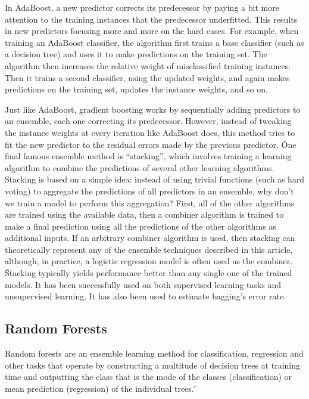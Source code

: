 In AdaBoost, a new predictor corrects its predecessor by paying a bit more attention to the training instances that
the predecessor underfitted. This results in new predictors focusing more and more on the hard cases. For example,
when training an AdaBoost classifier, the algorithm first trains a base classifier (such as a decision tree) and uses
it to make predictions on the training set. The algorithm then increases the relative weight of misclassified
training instances. Then it trains a second classifier, using the updated weights, and again makes predictions on the
training set, updates the instance weights, and so on.

\vspace{7pt}


\v

Just like AdaBoost, gradient boosting works by sequentially adding predictors to an ensemble, each one correcting its
predecessor. However, instead of tweaking the instance weights at every iteration like AdaBoost does, this method
tries to fit the new predictor to the residual errors made by the previous predictor. \v

One final famous ensemble method is ``stacking'', which involves training a learning algorithm to combine the
predictions of several other learning algorithms. Stacking is based on a simple idea: instead of using trivial
functions (such as hard voting) to aggregate the predictions of all predictors in an ensemble, why don't we train a
model to perform this aggregation? First, all of the other algorithms are trained using the available data, then a
combiner algorithm is trained to make a final prediction using all the predictions of the other algorithms as
additional inputs. If an arbitrary combiner algorithm is used, then stacking can theoretically represent any of the
ensemble techniques described in this article, although, in practice, a logistic regression model is often used as
the combiner. \v

Stacking typically yields performance better than any single one of the trained models. It has been successfully used
on both supervised learning tasks and unsupervised learning. It has also been used to estimate bagging's error rate.

\subsection{Random Forests}

Random forests are an ensemble learning method for classification, regression and other tasks that operate by
constructing a multitude of decision trees at training time and outputting the class that is the mode of the classes
(classification) or mean prediction (regression) of the individual trees. \v

